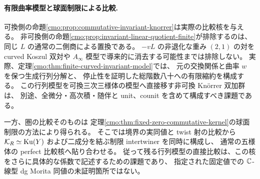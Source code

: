 \paragraph{有限曲率模型と球面制限による比較.}
可換側の命題\ref{cmo:prop:commutative-invariant-knorrer}は実際の比較核を与える。
非可換側の命題\ref{cmo:prop:invariant-linear-quotient-finite}が排除するのは、
同じ $L$ の通常の二側商による置換である。
$-vL$ の非退化な重み $(2,1)$ の対を curved Koszul 双対や
$A_\infty$ 模型で導来的に消去する可能性までは排除しない。
実際、定理\ref{cmo:thm:finite-curved-invariant-model}では、
元の交換関係と曲率 $w$ を保つ生成行列分解と、
停止性を証明した総階数八十への有限縮約を構成する。
この行列模型を可換三次三様体の模型へ直接移す非可換 Kn\"orrer 双加群は、
別途、全微分・高次積・随伴と unit、counit を含めて構成すべき課題である。

一方、圏の比較そのものは
定理\ref{cmo:thm:fixed-zero-commutative-kernel}の球面制限の方法により得られる。
そこでは境界の実同値と twist 射の比較から
$\mathcal K_R\simeq\operatorname{Ku}(Y)$ および二成分を結ぶ制限 intertwiner を同時に構成し、
通常の五様体の perfect 比較核へ貼り合わせる。
従って残る行列模型の直接比較は、この核をさらに具体的な係数で記述するための課題であり、
指定された固定値での $\mathbb C$-線型 dg Morita 同値の未証明箇所ではない。

